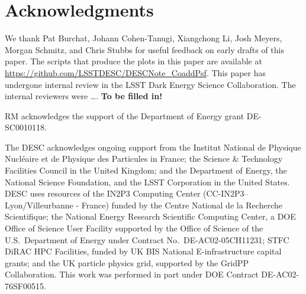 \documentclass{aastex63}
\begin{document}
\section*{Acknowledgments}

We thank Pat Burchat, Johann Cohen-Tanugi, Xiangchong Li, Josh Meyers, Morgan Schmitz, and Chris Stubbs for useful feedback on early  drafts of this paper. The scripts that produce the plots in this paper are available at \url{https://github.com/LSSTDESC/DESCNote_CoaddPsf}.  This paper has undergone internal review in the LSST Dark Energy Science Collaboration. The internal reviewers were \ldots. \textbf{To be filled in!} 

RM acknowledges the support of the Department of Energy grant DE-SC0010118.

The DESC acknowledges ongoing support from the Institut National de 
Physique Nucl\'eaire et de Physique des Particules in France; the 
Science \& Technology Facilities Council in the United Kingdom; and the
Department of Energy, the National Science Foundation, and the LSST 
Corporation in the United States.  DESC uses resources of the IN2P3 
Computing Center (CC-IN2P3--Lyon/Villeurbanne - France) funded by the 
Centre National de la Recherche Scientifique; the National Energy 
Research Scientific Computing Center, a DOE Office of Science User 
Facility supported by the Office of Science of the U.S.\ Department of
Energy under Contract No.\ DE-AC02-05CH11231; STFC DiRAC HPC Facilities, 
funded by UK BIS National E-infrastructure capital grants; and the UK 
particle physics grid, supported by the GridPP Collaboration.  This 
work was performed in part under DOE Contract DE-AC02-76SF00515.


  
\end{document}
